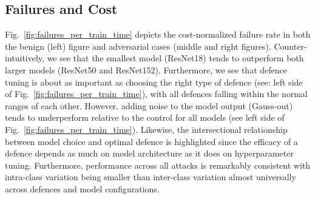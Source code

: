 \subsection{Failures and Cost}


Fig.~\ref{fig:failures_per_train_time} depicts the cost-normalized failure rate in both the benign (left) figure and adversarial cases (middle and right figures). Counter-intuitively, we see that the smallest model (ResNet18) tends to outperform both larger models (ResNet50 and ResNet152). Furthermore, we see that defence tuning is about as important as choosing the right type of defence (see: left side of Fig.~\ref{fig:failures_per_train_time}), with all defences falling within the normal ranges of each other. However, adding noise to the model output (Gauss-out) tends to underperform relative to the control for all models (see left side of Fig.~\ref{fig:failures_per_train_time}). Likewise, the intersectional relationship between model choice and optimal defence is highlighted since the efficacy of a defence depends as much on model architecture as it does on hyperparameter tuning.  Furthermore, performance across all attacks is remarkably consistent with intra-class variation being smaller than inter-class variation almost universally across defences and model configurations.

